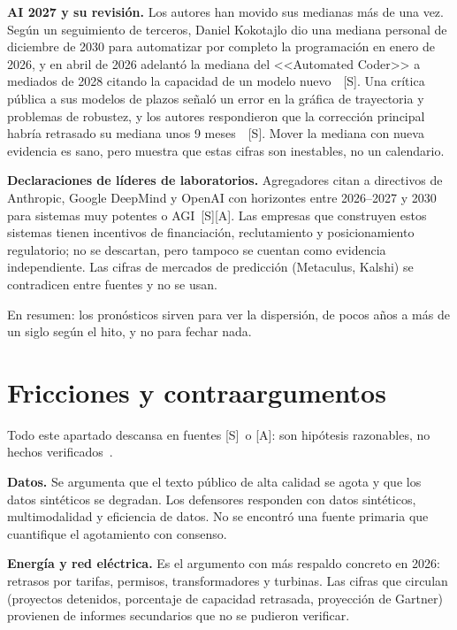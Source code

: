 \documentclass[10pt]{article}
\newcommand{\tS}{\textsf{\small[S]}}
\newcommand{\tA}{\textsf{\small[A]}}
\begin{document}
\textbf{AI 2027 y su revisi\'on.} Los autores han movido sus medianas m\'as de una vez. Seg\'un un seguimiento de terceros, Daniel Kokotajlo dio una mediana personal de diciembre de 2030 para automatizar por completo la programaci\'on en enero de 2026, y en abril de 2026 adelant\'o la mediana del <<Automated Coder>> a mediados de 2028 citando la capacidad de un modelo nuevo~\cite{ai2027tracker}~\tS. Una cr\'itica p\'ublica a sus modelos de plazos se\~nal\'o un error en la gr\'afica de trayectoria y problemas de robustez, y los autores respondieron que la correcci\'on principal habr\'ia retrasado su mediana unos 9 meses~\cite{aifutures}~\tS. Mover la mediana con nueva evidencia es sano, pero muestra que estas cifras son inestables, no un calendario.

\textbf{Declaraciones de l\'ideres de laboratorios.} Agregadores citan a directivos de Anthropic, Google DeepMind y OpenAI con horizontes entre 2026--2027 y 2030 para sistemas muy potentes o AGI~\tS\tA. Las empresas que construyen estos sistemas tienen incentivos de financiaci\'on, reclutamiento y posicionamiento regulatorio; no se descartan, pero tampoco se cuentan como evidencia independiente. Las cifras de mercados de predicci\'on (Metaculus, Kalshi) se contradicen entre fuentes y no se usan.

En resumen: los pron\'osticos sirven para ver la dispersi\'on, de pocos a\~nos a m\'as de un siglo seg\'un el hito, y no para fechar nada.

\section{Fricciones y contraargumentos}

Todo este apartado descansa en fuentes \tS\ o \tA: son hip\'otesis razonables, no hechos verificados~\cite{longtermwiki}.

\textbf{Datos.} Se argumenta que el texto p\'ublico de alta calidad se agota y que los datos sint\'eticos se degradan. Los defensores responden con datos sint\'eticos, multimodalidad y eficiencia de datos. No se encontr\'o una fuente primaria que cuantifique el agotamiento con consenso.

\textbf{Energ\'ia y red el\'ectrica.} Es el argumento con m\'as respaldo concreto en 2026: retrasos por tarifas, permisos, transformadores y turbinas. Las cifras que circulan (proyectos detenidos, porcentaje de capacidad retrasada, proyecci\'on de Gartner) provienen de informes secundarios que no se pudieron verificar.
\end{document}
